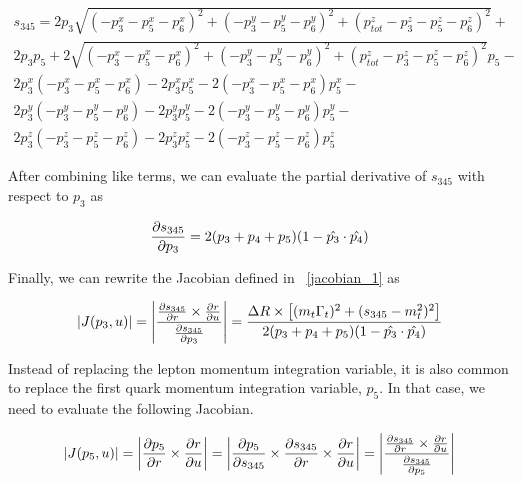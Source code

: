 \begin{eqnarray}
\label{defines345_2}
\nonumber
s_{345} = 2p_{3}\sqrt{(-p_{3}^{x} -p_{5}^{x} -p_{6}^{x})^{2} + (-p_{3}^{y}
-p_{5}^{y} -p_{6}^{y})^{2} + (p_{tot}^{z} -p_{3}^{z} -p_{5}^{z} -p_{6}^{z})^{2}}
+ \\
\nonumber
2p_{3}p_{5} + 2\sqrt{(-p_{3}^{x} -p_{5}^{x} -p_{6}^{x})^{2} + (-p_{3}^{y} -p_{5}^{y}
-p_{6}^{y})^{2} + (p_{tot}^{z} -p_{3}^{z} -p_{5}^{z} -p_{6}^{z})^{2}}p_{5} - \\
\nonumber
2p_{3}^{x}(-p_{3}^{x} -p_{5}^{x} -p_{6}^{x}) - 2p_{3}^{x}p_{5}^{x} -
2(-p_{3}^{x} -p_{5}^{x} -p_{6}^{x})p_{5}^{x} - \\
\nonumber
2p_{3}^{y}(-p_{3}^{y} -p_{5}^{y} -p_{6}^{y}) - 2p_{3}^{y}p_{5}^{y} -
2(-p_{3}^{y} -p_{5}^{y} -p_{6}^{y})p_{5}^{y} - \\
2p_{3}^{z}(-p_{3}^{z} -p_{5}^{z} -p_{6}^{z}) - 2p_{3}^{z}p_{5}^{z} - 2(-p_{3}^{z} -p_{5}^{z} -p_{6}^{z})p_{5}^{z}
\end{eqnarray}

After combining like terms, we can evaluate the partial derivative of $s_{345}$
with respect to $p_{3}$ as

\begin{equation}
\label{ds345dp3}
\frac{\partial s_{345}}{\partial p_{3}} = 2(p_{3} + p_{4} + p_{5})(1 - \hat{p_{3}} \cdot \hat{p_{4}})
\end{equation}

Finally, we can rewrite the Jacobian defined in ~\ref{jacobian_1} as

\begin{equation}
\label{jacobian_2}
|J(p_{3}, u)| = \left | \frac{\frac{\partial s_{345}}{\partial r} \times
\frac{\partial r}{\partial u}}{\frac{\partial s_{345}}{\partial p_{3}}} \right | = \frac{\Delta R \times \left[
(m_{t}\Gamma_{t})^{2} + (s_{345} - m_{t}^{2})^{2} \right]}{2(p_{3} + p_{4} + p_{5})(1 - \hat{p_{3}} \cdot \hat{p_{4}})}
\end{equation}


Instead of replacing the lepton momentum integration variable, it is also common
to replace the first quark momentum integration variable, $p_{5}$. In that case,
we need to evaluate the following Jacobian.

\begin{equation}
\label{jacobian_3}
|J(p_{5}, u)| = \left| \frac{\partial p_{5}}{\partial r} \times \frac{\partial r}{\partial u} \right| = \left|
\frac{\partial p_{5}}{\partial s_{345}} \times \frac{\partial s_{345}}{\partial r} \times \frac{\partial r}{\partial u} \right| =
\left | \frac{\frac{\partial s_{345}}{\partial r} \times
\frac{\partial r}{\partial u}}{\frac{\partial s_{345}}{\partial p_{5}}} \right |
\end{equation}

